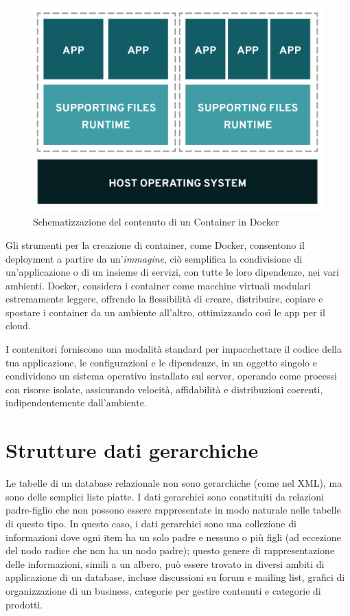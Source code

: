 \begin{figure}[ht!]
	\centering
	\includegraphics[scale=0.7]{images/Docker_Config_Container.png}
	\caption{Schematizzazione del contenuto di un Container in Docker}
	\label{fig:DCC}
\end{figure}

Gli strumenti per la creazione di container, come Docker, consentono il deployment a partire da un'\textit{immagine}, ciò semplifica la condivisione di 
un'applicazione o di un insieme di servizi, con tutte le loro dipendenze, nei vari ambienti.
Docker, considera i container come macchine virtuali modulari estremamente leggere, offrendo la flessibilità di creare, distribuire, 
copiare e spostare i container da un ambiente all'altro, ottimizzando così le app per il cloud.

I contenitori forniscono una modalità standard per impacchettare il codice della tua applicazione, le configurazioni e le dipendenze, in un oggetto singolo e 
condividono un sistema operativo installato sul server, operando come processi con risorse isolate, assicurando velocità, affidabilità e distribuzioni coerenti, 
indipendentemente dall’ambiente.

\section{Strutture dati gerarchiche}
Le tabelle di un database relazionale non sono gerarchiche (come nel XML), ma sono delle semplici liste piatte. I dati gerarchici sono 
constituiti da relazioni padre-figlio che non possono essere rappresentate in modo naturale nelle tabelle di questo tipo.
In questo caso, i dati gerarchici sono una collezione di informazioni dove ogni item ha un solo padre e nessuno o più figli
(ad eccezione del nodo radice che non ha un nodo padre); questo genere di rappresentazione delle informazioni, simili a un albero, 
può essere trovato in diversi ambiti di applicazione di un database, incluse discussioni su forum e mailing list, grafici di 
organizzazione di un business, categorie per gestire contenuti e categorie di prodotti. \\

